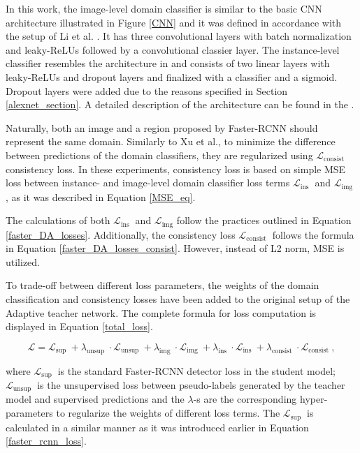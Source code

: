 In this work, the image-level domain classifier is similar to the basic CNN architecture illustrated in Figure \ref{CNN} and it was defined in accordance with the setup of Li et al. \cite{Li2021}. It has three convolutional layers with batch normalization and leaky-ReLUs followed by a convolutional classier layer. The instance-level classifier resembles the architecture in \cite{Xu2020} and consists of two linear layers with leaky-ReLUs and dropout layers and finalized with a classifier and a sigmoid. Dropout layers were added due to the reasons specified in Section \ref{alexnet_section}. A detailed description of the architecture can be found in the . 

Naturally, both an image and a region proposed by Faster-RCNN should represent the same domain. Similarly to Xu et al., to minimize the difference between predictions of the domain classifiers, they are regularized using $\mathcal{L}_{\text {consist }}$ consistency loss. In these experiments, consistency loss is based on simple MSE loss between instance- and image-level domain classifier loss terms $\mathcal{L}_{\text {ins }}$ and $\mathcal{L}_{\text {img }}$, as it was described in Equation \ref{MSE_eq}.

The calculations of both $\mathcal{L}_{\text {ins }}$ and $\mathcal{L}_{\text {img}}$ follow the practices outlined in Equation \ref{faster_DA_losses}. Additionally,  the consistency loss $\mathcal{L}_{\text {consist }}$ follows the formula in Equation \ref{faster_DA_losses_consist}. However, instead of L2 norm, MSE is utilized.  

To trade-off between different loss parameters, the weights of the domain classification and consistency losses have been added to the original setup of the Adaptive teacher network. The complete formula for loss computation is displayed in Equation \ref{total_loss}. 

\begin{equation}
\mathcal{L}=\mathcal{L}_{\text {sup }}+\lambda_{\text {unsup }} \cdot \mathcal{L}_{\text {unsup }}+\lambda_{\text {img }} \cdot \mathcal{L}_{\text {img }}+\lambda_{\text {ins }} \cdot \mathcal{L}_{\text {ins }}+\lambda_{\text {consist }} \cdot \mathcal{L}_{\text {consist }},
\label{total_loss} 
\end{equation}

where $\mathcal{L}_{\text {sup }}$ is the standard Faster-RCNN detector loss in the student model; $\mathcal{L}_{\text {unsup }}$ is the unsupervised loss between pseudo-labels generated by the teacher model and supervised predictions and the $\lambda$-s are the corresponding hyper-parameters to regularize the weights of different loss terms. The $\mathcal{L}_{\text {sup }}$ is calculated in a similar manner as it was introduced earlier in Equation \ref{faster_rcnn_loss}. 
 
